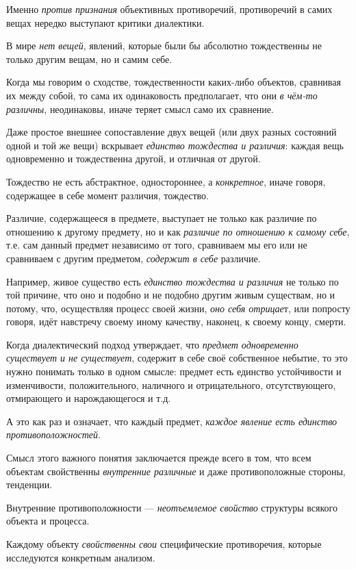 \documentclass[a4paper,14pt,russian]{extreport}
\begin{document}
Именно \emph{против признания} объективных противоречий, противоречий в самих вещах нередко выступают критики диалектики.

В мире \emph{нет вещей}, явлений, которые были бы абсолютно тождественны не только другим вещам, но и самим себе.

Когда мы говорим о сходстве, тождественности каких-либо объектов, сравнивая их между собой, то сама их одинаковость предполагает, что они \emph{в чём-то различны}, неодинаковы, иначе теряет смысл само их сравнение.

Даже простое внешнее сопоставление двух вещей (или двух разных состояний одной и той же вещи) вскрывает \emph{единство тождества и различия}: каждая вещь одновременно и тождественна другой, и отличная от другой.

Тождество не есть абстрактное, одностороннее, а \emph{конкретное}, иначе говоря, содержащее в себе момент различия, тождество.

Различие, содержащееся в предмете, выступает не только как различие по отношению к другому предмету, но и как \emph{различие по отношению к самому себе}, т.е. сам данный предмет независимо от того, сравниваем мы его или не сравниваем с другим предметом, \emph{содержит в себе} различие.

Например, живое существо есть \emph{единство тождества и различия} не только по той причине, что оно и подобно и не подобно другим живым существам, но и потому, что, осуществляя процесс своей жизни, \emph{оно себя отрицае}т, или попросту говоря, идёт навстречу своему иному качеству, наконец, к своему концу, смерти.

Когда диалектический подход утверждает, что \emph{предмет одновременно существует и не существует}, содержит в себе своё собственное небытие, то это нужно понимать только в одном смысле: предмет есть единство устойчивости и изменчивости, положительного, наличного и отрицательного, отсутствующего, отмирающего и нарождающегося и т.д.

А это как раз и означает, что каждый предмет, \emph{каждое явление есть единство противоположностей}.

Смысл этого важного понятия заключается прежде всего в том, что всем объектам свойственны \emph{внутренние различные} и даже противоположные стороны, тенденции.

Внутренние противоположности --- \emph{неотъемлемое свойство} структуры всякого объекта и процесса.

Каждому объекту \emph{свойственны свои} специфические противоречия, которые исследуются конкретным анализом.
\end{document}
